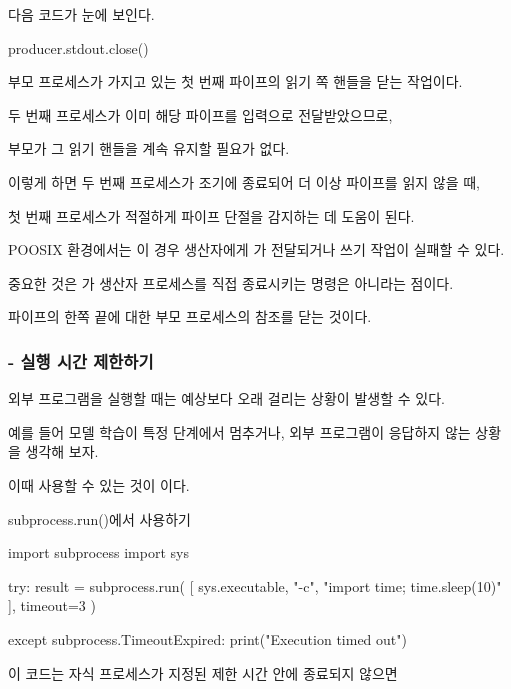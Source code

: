 다음 코드가 눈에 보인다.

\begin{dhkzsh}
producer.stdout.close()
\end{dhkzsh}

부모 프로세스가 가지고 있는 첫 번째 파이프의 읽기 쪽 핸들을 닫는 작업이다.

두 번째 프로세스가 이미 해당 파이프를 입력으로 전달받았으므로,

부모가 그 읽기 핸들을 계속 유지할 필요가 없다.

이렇게 하면 두 번째 프로세스가 조기에 종료되어 더 이상 파이프를 읽지 않을 때,

첫 번째 프로세스가 적절하게 파이프 단절을 감지하는 데 도움이 된다.

POOSIX 환경에서는 이 경우 생산자에게 가 전달되거나 쓰기 작업이 실패할 수 있다.

중요한 것은 가 생산자 프로세스를 직접 종료시키는 명령은 아니라는 점이다.

파이프의 한쪽 끝에 대한 부모 프로세스의 참조를 닫는 것이다.

\subsubsection{ - 실행 시간 제한하기}

외부 프로그램을 실행할 때는 예상보다 오래 걸리는 상황이 발생할 수 있다.

예를 들어 모델 학습이 특정 단계에서 멈추거나, 외부 프로그램이 응답하지 않는 상황을 생각해 보자.

이때 사용할 수 있는 것이 이다.

\begin{dhknote}
\begin{dhksmry}[centered]
subprocess.run()에서 사용하기
\end{dhksmry}
\end{dhknote}

\begin{dhkcode}
import subprocess
import sys

try:
    result = subprocess.run(
        [
            sys.executable,
            "-c",
            "import time; time.sleep(10)"
        ],
        timeout=3
    )

except subprocess.TimeoutExpired:
    print("Execution timed out")
\end{dhkcode}

이 코드는 자식 프로세스가 지정된 제한 시간 안에 종료되지 않으면

